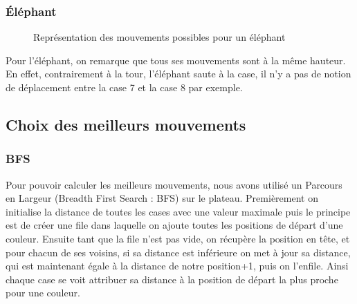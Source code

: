 \subsubsection{Éléphant}
\begin{figure}[H]
    \centering
    \hspace{1.5em}
    \caption{Représentation des mouvements possibles pour un éléphant}
\end{figure}
Pour l'éléphant, on remarque que tous ses mouvements sont à la même hauteur.
En effet, contrairement à la tour, l'éléphant saute à la case, il n'y a pas
de notion de déplacement entre la case 7 et la case 8 par exemple.
\subsection{Choix des meilleurs mouvements}
\subsubsection{BFS}
Pour pouvoir calculer les meilleurs mouvements, nous avons utilisé un Parcours en Largeur (Breadth First Search : BFS) sur le plateau.
Premièrement on initialise la distance de toutes les cases avec une valeur maximale puis
le principe est de créer une file dans laquelle on ajoute toutes les positions de départ d'une couleur.
Ensuite tant que la file n'est pas vide, on récupère la position en tête, et pour chacun de ses voisins,
si sa distance est inférieure on met à jour sa distance, qui est maintenant égale à la distance de notre position+1,
puis on l'enfile.
Ainsi chaque case se voit attribuer sa distance à la position de départ la plus proche pour une couleur.

